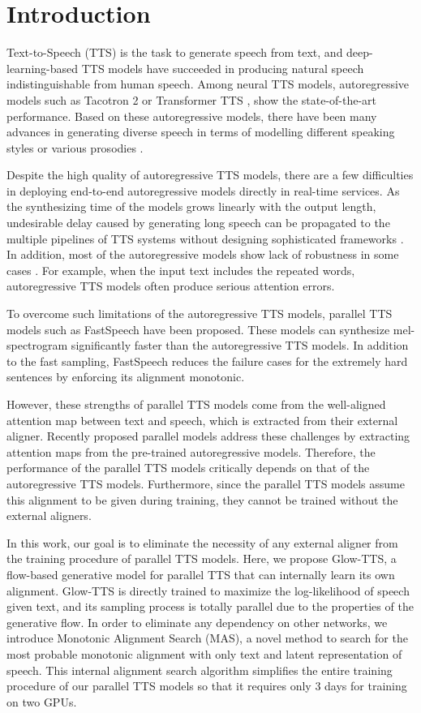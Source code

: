 \documentclass{article}
\begin{document}
\section{Introduction}
Text-to-Speech (TTS) is the task to generate speech from text, and deep-learning-based TTS models have succeeded in producing natural speech indistinguishable from human speech.
Among neural TTS models, autoregressive models such as Tacotron 2 \cite{shen2018natural} or Transformer TTS \cite{li2019neural}, show the state-of-the-art performance. Based on these autoregressive models, there have been many advances in generating diverse speech in terms of modelling different speaking styles or various prosodies \cite{wang2018style,skerry2018towards,jia2018transfer}.

Despite the high quality of autoregressive TTS models, there are a few difficulties in deploying end-to-end autoregressive models directly in real-time services. As the synthesizing time of the models grows linearly with the output length, undesirable delay caused by generating long speech can be propagated to the multiple pipelines of TTS systems without designing sophisticated frameworks \cite{ma2019incremental}. 
In addition, most of the autoregressive models show lack of robustness in some cases \cite{ren2019fastspeech}. For example, when the input text includes the repeated words, autoregressive TTS models often produce serious attention errors. 

To overcome such limitations of the autoregressive TTS models, parallel TTS models such as FastSpeech have been proposed. These models can synthesize mel-spectrogram significantly faster than the autoregressive TTS models. In addition to the fast sampling, FastSpeech reduces the failure cases for the extremely hard sentences by enforcing its alignment monotonic.


However, these strengths of parallel TTS models come from the well-aligned attention map between text and speech, which is extracted from their external aligner. Recently proposed parallel models address these challenges by extracting attention maps from the pre-trained autoregressive models. Therefore, the performance of the parallel TTS models critically depends on that of the autoregressive TTS models. Furthermore, since the parallel TTS models assume this alignment to be given during training, they cannot be trained without the external aligners.


In this work, our goal is to eliminate the necessity of any external aligner from the training procedure of parallel TTS models. Here, we propose Glow-TTS, a flow-based generative model for parallel TTS that can internally learn its own alignment. Glow-TTS is directly trained to maximize the log-likelihood of speech given text, and its sampling process is totally parallel due to the properties of the generative flow. In order to eliminate any dependency on other networks, we introduce Monotonic Alignment Search (MAS), a novel method to search for the most probable monotonic alignment with only text and latent representation of speech. This internal alignment search algorithm simplifies the entire training procedure of our parallel TTS models so that it requires only 3 days for training on two GPUs.
\end{document}
